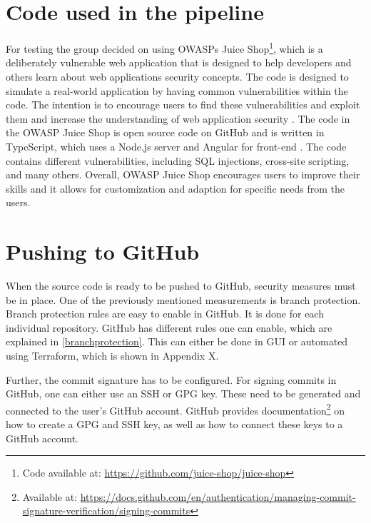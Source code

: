 \section{Code used in the pipeline}
For testing the group decided on using OWASPs Juice Shop\footnote{Code available at: \url{https://github.com/juice-shop/juice-shop}}, which is a deliberately vulnerable web application that is designed to help developers and others learn about web applications security concepts. The code is designed to simulate a real-world application by having common vulnerabilities within the code. The intention is to encourage users to find these vulnerabilities and exploit them and increase the understanding of web application security \cite{owaspJuiceShop}.
The code in the OWASP Juice Shop is open source code on GitHub and is written in TypeScript, which uses a Node.js server and Angular for \gls{front-end} \cite{owaspJuiceShopCode}.
The code contains different vulnerabilities, including SQL injections, cross-site scripting, and many others. 
Overall, OWASP Juice Shop encourages users to improve their skills and it allows for customization and adaption for specific needs from the users. 

\section{Pushing to GitHub}
When the source code is ready to be pushed to GitHub, security measures must be in place. One of the previously mentioned measurements is branch protection. Branch protection rules are easy to enable in GitHub. It is done for each individual repository. GitHub has different rules one can enable, which are explained in \ref{branchprotection}. This can either be done in \gls{GUI} or automated using Terraform, which is shown in Appendix X. 

Further, the commit signature has to be configured. For signing commits in GitHub, one can either use an SSH or GPG key. These need to be generated and connected to the user's GitHub account.
GitHub provides documentation\footnote{Available at: \url{https://docs.github.com/en/authentication/managing-commit-signature-verification/signing-commits}} on how to create a GPG and SSH key, as well as how to connect these keys to a GitHub account.

